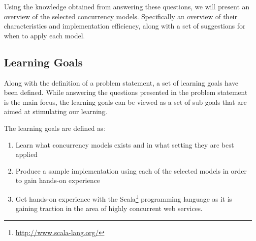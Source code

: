 Using the knowledge obtained from answering these questions, we will present an overview of the selected concurrency models. Specifically an overview of their characteristics and implementation efficiency, along with a set of suggestions for when to apply each model.

\subsection{Learning Goals}
Along with the definition of a problem statement, a set of learning goals have been defined. While answering the questions presented in the problem statement is the main focus, the learning goals can be viewed as a set of sub goals that are aimed at stimulating our learning.

The learning goals are defined as:
\begin{enumerate}
\item Learn what concurrency models exists and in what setting they are best applied
\item Produce a sample implementation using each of the selected models in order to gain hands-on experience
\item Get hands-on experience with the Scala\footnote{\url{http://www.scala-lang.org/}} programming language as it is gaining traction in the area of highly concurrent web services.
\end{enumerate}

\worksheetend